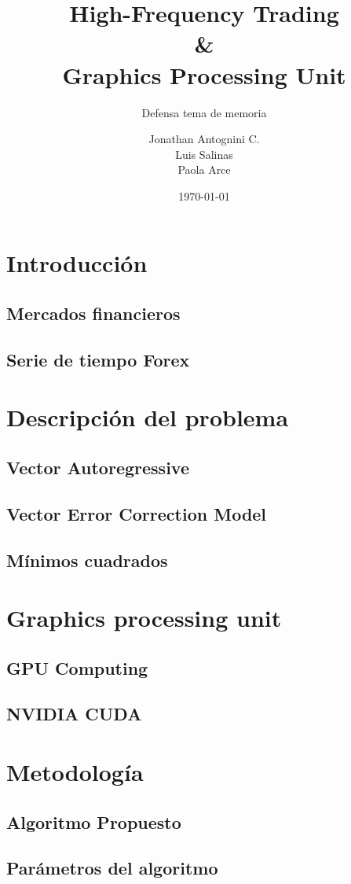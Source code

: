 \documentclass{beamer}
\title{High-Frequency Trading \\ \& \\ Graphics Processing Unit}
\subtitle{Defensa tema de memoria}
\author{Jonathan Antognini C.\\
		Luis Salinas\\
        Paola Arce}
\institute[]{Universidad Técnica Federico Santa María}
\date{\today}
\begin{document}
    \frame{\titlepage}
    \frame{\tableofcontents}
	\section{Introducción}
        \subsection{Mercados financieros}
        \subsection{Serie de tiempo Forex}
    \section{Descripción del problema}
        \subsection{Vector Autoregressive}
        \subsection{Vector Error Correction Model}
        \subsection{Mínimos cuadrados}
	\section{Graphics processing unit}
		\subsection{GPU Computing}
		\subsection{NVIDIA CUDA}
	\section{Metodología}
        \subsection{Algoritmo Propuesto}
        \subsection{Parámetros del algoritmo}
\end{document}
